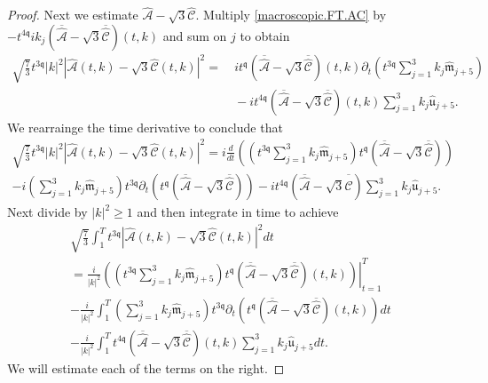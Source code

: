 \documentclass[reqno]{amsart}
\newcommand{\qq}{\mathfrak{q}}
\newcommand{\tq}{t^{\qq}}
\newcommand{\tTq}{t^{3\qq}}
\theoremstyle{definition}
\numberwithin{equation}{section}
\numberwithin{theorem}{section}
\begin{document}
\begin{proof}
Next we estimate $\widehat{\mathcal{A}}- \sqrt{3}\widehat{\mathcal{C}}$.  Multiply \eqref{macroscopic.FT.AC} by $-t^{4\qq} ik_j  \left( \overline{\widehat{\mathcal{A}}}- \sqrt{3}\overline{\widehat{\mathcal{C}}}\right)(t,k)$ and sum on $j$ to obtain
\begin{align*}
\sqrt{\frac{7}{3}}\tTq |k|^2   \left|\widehat{\mathcal{A}}(t,k)- \sqrt{3}\widehat{\mathcal{C}}(t,k)\right|^2
= &~ 
 i \tq\left( \overline{\widehat{\mathcal{A}}}- \sqrt{3}\overline{\widehat{\mathcal{C}}}\right)(t,k)\partial_t \left(\tTq\sum_{j=1}^3 k_j    \widehat{\mathfrak{m}}_{j+5} \right)
\\
&~
-
i t^{4\qq}\left( \overline{\widehat{\mathcal{A}}}- \sqrt{3}\overline{\widehat{\mathcal{C}}}\right)(t,k)  \sum_{j=1}^3 k_j\hat{\mathfrak{u}}_{j+5}.
\end{align*}
We rearrainge the time derivative to conclude that
\begin{multline*}
\sqrt{\frac{7}{3}}\tTq |k|^2   \left|\widehat{\mathcal{A}}(t,k)- \sqrt{3}\widehat{\mathcal{C}}(t,k)\right|^2
=   i \frac{d}{dt} \left(  \left(\tTq\sum_{j=1}^3 k_j    \widehat{\mathfrak{m}}_{j+5} \right)\tq\left( \overline{\widehat{\mathcal{A}}}- \sqrt{3}\overline{\widehat{\mathcal{C}}}\right) \right)
\\
-
i  \left( \sum_{j=1}^3 k_j    \widehat{\mathfrak{m}}_{j+5} \right) \tTq\partial_t  \left(\tq\left( \overline{\widehat{\mathcal{A}}}- \sqrt{3}\overline{\widehat{\mathcal{C}}}\right)\right)
-
i t^{4\qq}\left( \overline{\widehat{\mathcal{A}}}- \sqrt{3}\overline{\widehat{\mathcal{C}}}\right)  \sum_{j=1}^3 k_j\hat{\mathfrak{u}}_{j+5}.
\end{multline*}
Next divide by $|k|^2 \ge 1$ and then integrate in time to achieve
\begin{multline*}
\sqrt{\frac{7}{3}}\int_1^{T} \tTq \left|\widehat{\mathcal{A}}(t,k)- \sqrt{3}\widehat{\mathcal{C}}(t,k)\right|^2  dt
\\
=
\left. \frac{i}{|k|^2} \left(  \left(\tTq\sum_{j=1}^3 k_j    \widehat{\mathfrak{m}}_{j+5} \right)\tq\left( \overline{\widehat{\mathcal{A}}}- \sqrt{3}\overline{\widehat{\mathcal{C}}}\right)(t,k) \right)\right|_{t=1}^T
\\
-
\frac{i}{|k|^2} \int_1^{T} \left( \sum_{j=1}^3 k_j    \widehat{\mathfrak{m}}_{j+5} \right) \tTq\partial_t  \left(\tq\left( \overline{\widehat{\mathcal{A}}}- \sqrt{3}\overline{\widehat{\mathcal{C}}}\right)(t,k)\right) dt
\\
-
\frac{i}{|k|^2} \int_1^{T} t^{4\qq}\left( \overline{\widehat{\mathcal{A}}}- \sqrt{3}\overline{\widehat{\mathcal{C}}}\right)(t,k)  \sum_{j=1}^3 k_j\hat{\mathfrak{u}}_{j+5} dt.
\end{multline*}
We will estimate each of the terms on the right.  


\end{proof}
\end{document}
